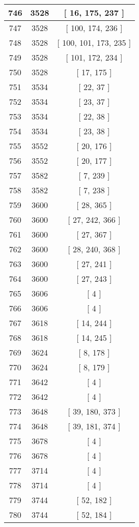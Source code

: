 \begin{center}
\begin{longtable}[H]{|| c c c ||}
\hline
746 & 3528 & [ 16, 175, 237 ] \\ 
\hline
747 & 3528 & [ 100, 174, 236 ] \\ 
\hline
748 & 3528 & [ 100, 101, 173, 235 ] \\ 
\hline
749 & 3528 & [ 101, 172, 234 ] \\ 
\hline
750 & 3528 & [ 17, 175 ] \\ 
\hline
751 & 3534 & [ 22, 37 ] \\ 
\hline
752 & 3534 & [ 23, 37 ] \\ 
\hline
753 & 3534 & [ 22, 38 ] \\ 
\hline
754 & 3534 & [ 23, 38 ] \\ 
\hline
755 & 3552 & [ 20, 176 ] \\ 
\hline
756 & 3552 & [ 20, 177 ] \\ 
\hline
757 & 3582 & [ 7, 239 ] \\ 
\hline
758 & 3582 & [ 7, 238 ] \\ 
\hline
759 & 3600 & [ 28, 365 ] \\ 
\hline
760 & 3600 & [ 27, 242, 366 ] \\ 
\hline
761 & 3600 & [ 27, 367 ] \\ 
\hline
762 & 3600 & [ 28, 240, 368 ] \\ 
\hline
763 & 3600 & [ 27, 241 ] \\ 
\hline
764 & 3600 & [ 27, 243 ] \\ 
\hline
765 & 3606 & [ 4 ] \\ 
\hline
766 & 3606 & [ 4 ] \\ 
\hline
767 & 3618 & [ 14, 244 ] \\ 
\hline
768 & 3618 & [ 14, 245 ] \\ 
\hline
769 & 3624 & [ 8, 178 ] \\ 
\hline
770 & 3624 & [ 8, 179 ] \\ 
\hline
771 & 3642 & [ 4 ] \\ 
\hline
772 & 3642 & [ 4 ] \\ 
\hline
773 & 3648 & [ 39, 180, 373 ] \\ 
\hline
774 & 3648 & [ 39, 181, 374 ] \\ 
\hline
775 & 3678 & [ 4 ] \\ 
\hline
776 & 3678 & [ 4 ] \\ 
\hline
777 & 3714 & [ 4 ] \\ 
\hline
778 & 3714 & [ 4 ] \\ 
\hline
779 & 3744 & [ 52, 182 ] \\ 
\hline
780 & 3744 & [ 52, 184 ] \\ 

\end{longtable}
\end{center}
